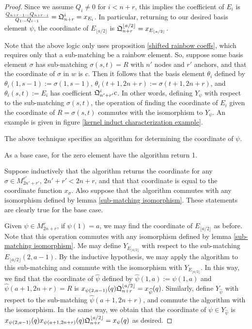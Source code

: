 \documentclass{amsart}
\begin{document}
\begin{proof}
 	Since we assume $Q_i\not=0$ for $i< n+r$, this implies the coefficient of $E_i$ is $\frac{Q_{n+r-1}...Q_{n+r-i}}{Q_1...Q_{i-1}}=\mathfrak{Q}^i_{n+r}=x_{E_i}$. In particular, returning to our desired basis element $\psi$, the coordinate of $E_{\lfloor a/2\rfloor}$ is $\mathfrak{Q}^{\lfloor a/2\rfloor}_{n+r}=x_{E_{\lfloor a/2\rfloor}}$.
 	
 	Note that the above logic only uses proposition \ref{shifted rainbow coeffs}, which requires only that a sub-matching be a rainbow element. So, suppose some basis element $\sigma$ has sub-matching $\sigma(s,t)=R$ with $n'$ nodes and $r'$ anchors, and that the coordinate of $\sigma$ in $w$ is $c$. Then it follows that the basis element $\theta_i$ defined by $\theta_i(1,s-1):=\sigma(1,s-1)$, $\theta_i(t+1,2n+r):=\sigma(t+1,2n+r)$, and $\theta_i(s,t):=E_i$ has coefficient $\mathfrak{Q}^i_{n'+r'}c$. In other words, defining $Y_\psi$ with respect to the sub-matching $\sigma(s,t)$, the operation of finding the coordinate of $E_i$ given the coordinate of $R=\sigma(s,t)$ commutes with the isomorphism to $Y_\psi$.  An example is given in figure \ref{kernel induct characterization example}.
 	
 	\vspace{2mm}
 	The above technique specifies an algorithm for determining the coordinate of $\psi$. 
 	
 	As a base case, for the zero element have the algorithm return 1.
 	
 	Suppose inductively that the algorithm returns the coordinate for any $\sigma\in M_{2n'+r'}^{r'}$, $2n'+r'<2n+r$, and that that coordinate is equal to the coordinate function $x_\sigma$. Also suppose that the algorithm commutes with any isomorphism defined by lemma \ref{sub-matching isomorphism}. These statements are clearly true for the base case. 
 	
 	Given $\psi\in M_{2n+r}^r$, if $\psi(1)=a$, we may find the coordinate of $E_{\lfloor a/2\rfloor}$ as before. Note that this operation commutes with any isomorphism defined by lemma \ref{sub-matching isomorphism}. Me may define $Y_{E_{\lfloor a/2\rfloor}}$ with respect to the sub-matching $E_{\lfloor a/2\rfloor}(2,a-1)$. By the inductive hypothesis, we may apply the algorithm to this sub-matching and commute with the isomorphism with $Y_{E_{\lfloor a/2\rfloor}}$. In this way, we find that the coordinate of $\widehat{\psi}$ defined by $\widehat{\psi}(1,a):=\psi(1,a)$ and $\widehat{\psi}(a+1,2n+r)=R$ is $x_{\psi(2,a-1)}(q)\mathfrak{Q}^{\lfloor a/2\rfloor}_{n+r}=x_{\widehat{\psi}}(q)$. Similarly, define $Y_{\widehat{\psi}}$ with respect to the sub-matching $\widehat{\psi}(a+1,2n+r)$, and commute the algorithm with the isomorphism. In the same way, we obtain that the coordinate of $\psi\in Y_{\widehat{\psi}}$ is $x_{\psi(2,a-1)}(q)x_{\psi(a+1,2n+r)}(q)\mathfrak{Q}^{\lfloor a/2\rfloor}_{n+r}=x_\psi(q)$ as desired.
 	

\end{proof}
\end{document}
